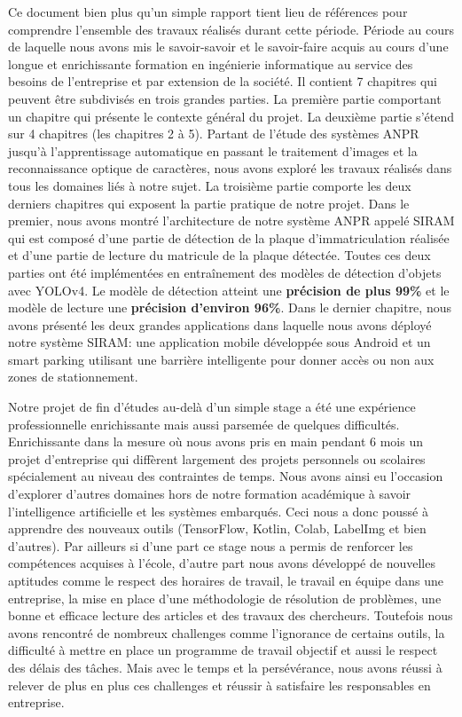 Ce document bien plus qu’un simple rapport tient lieu de références pour comprendre l’ensemble des travaux réalisés durant cette période. Période au cours de laquelle nous avons mis le  savoir-savoir et  le savoir-faire acquis au cours d’une longue et enrichissante formation en ingénierie informatique au service des besoins de l’entreprise et par extension de la société. Il contient 7 chapitres qui peuvent être subdivisés en trois grandes parties. La première partie comportant un chapitre qui présente le contexte général du projet. La deuxième partie s'étend sur 4 chapitres (les chapitres 2 à 5). Partant de l’étude des systèmes ANPR jusqu’à l’apprentissage automatique en passant le traitement d’images et la reconnaissance optique de caractères, nous avons exploré les travaux réalisés  dans tous les domaines liés à notre sujet. La troisième partie comporte les deux derniers chapitres qui exposent la partie pratique de notre projet. Dans le premier, nous avons montré l’architecture de notre système ANPR appelé SIRAM qui est composé d'une partie de détection de la plaque d’immatriculation réalisée  et d’une partie de lecture du matricule de la plaque détectée. Toutes ces deux parties ont été implémentées en entraînement des modèles de détection d’objets avec YOLOv4. Le modèle de détection atteint une \textbf{précision de plus 99\%} et le modèle de lecture une \textbf{précision d'environ 96\%}. Dans le dernier chapitre, nous avons présenté les deux grandes applications dans laquelle nous avons déployé notre système SIRAM: une application mobile développée sous Android et un smart parking utilisant une barrière intelligente pour donner accès ou non aux zones de stationnement.


Notre projet de fin d’études au-delà d’un simple stage a été une expérience professionnelle enrichissante mais aussi parsemée de quelques difficultés. Enrichissante dans la mesure où nous avons pris en main pendant 6 mois un projet d’entreprise qui diffèrent largement des projets personnels ou scolaires spécialement au niveau des contraintes de temps. Nous avons ainsi eu l’occasion d'explorer d'autres domaines hors de notre formation académique à savoir l’intelligence artificielle et les systèmes embarqués. Ceci nous a donc poussé à apprendre des nouveaux outils (TensorFlow, Kotlin, Colab, LabelImg et bien d’autres). Par ailleurs si d’une part ce stage nous a permis de renforcer les compétences acquises à l’école, d’autre part nous avons développé de nouvelles aptitudes comme le respect des horaires de travail, le travail en équipe dans une entreprise, la mise en place d’une méthodologie de résolution de problèmes, une bonne et efficace lecture des articles et des travaux des chercheurs. Toutefois nous avons rencontré de nombreux challenges comme l’ignorance de certains outils, la difficulté à mettre en place un programme de travail objectif et aussi le respect des délais des tâches. Mais avec le temps et la persévérance, nous avons réussi à relever de plus en plus ces challenges et réussir à satisfaire les responsables en entreprise. 


